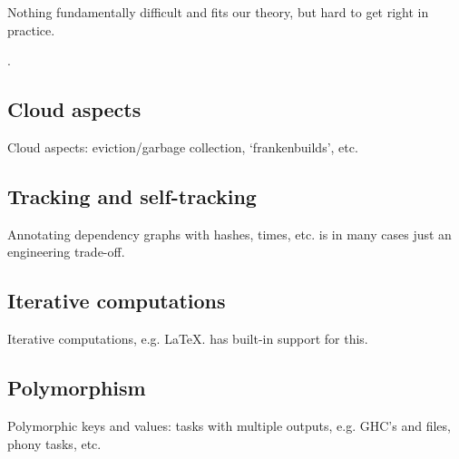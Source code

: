 Nothing fundamentally difficult and fits our theory, but hard to get right in
practice.

.

\subsection{Cloud aspects}\label{sec-cloud-aspects}

Cloud aspects: eviction/garbage collection, `frankenbuilds', etc.


\subsection{Tracking and self-tracking}\label{sec-tracking-aspects}

Annotating dependency graphs with hashes, times, etc. is in many cases just an
engineering trade-off.



\subsection{Iterative computations}\label{sec-iterative-compute}

Iterative computations, e.g. LaTeX. \Excel has built-in support for this.


\subsection{Polymorphism}\label{sec-polymorphism}

Polymorphic keys and values: tasks with multiple outputs, e.g. GHC's 
and  files, phony tasks, etc.


